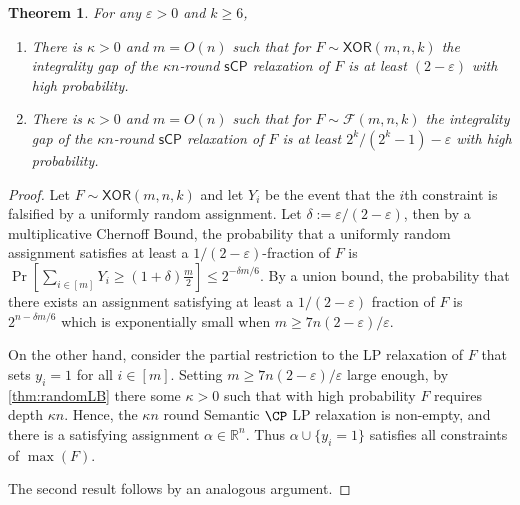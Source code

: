\documentclass[11pt]{article}
\numberwithin{equation}{section}
\newtheorem{theorem}{Theorem}[section]
\theoremstyle{definition}
\theoremstyle{plain}
\newcommand{\XOR}{\ensuremath{\mathsf{XOR}}}
\newcommand{\sCP}{\ensuremath{\mathsf{sCP}}}
\begin{document}
\begin{theorem}
	For any $\varepsilon >0$ and $k \geq 6$,
	\begin{enumerate}
		\item[$1$.] There is $\kappa>0$ and $m = O(n)$ such that for $F \sim \XOR(m,n,k)$ the integrality gap of the $\kappa n$-round  $\sCP$ relaxation of $F$ is at least $(2-\varepsilon)$ with high probability. 
		\item[$2$.] There is $\kappa >0$ and $m=O(n)$ such that for $F \sim \mathcal{F}(m,n,k)$ the integrality gap of the $\kappa n$-round $\sCP$ relaxation of $F$ is at least $2^k/(2^k-1) - \varepsilon$ with high probability.
	\end{enumerate}
\end{theorem}
\begin{proof}
	Let $F \sim \XOR(m,n,k)$ and let $Y_i$ be the event that the $i$th constraint is falsified by a uniformly random assignment. Let $\delta:=\varepsilon/(2-\varepsilon)$, then by a multiplicative Chernoff Bound, the probability that a uniformly random assignment satisfies at least a $1/(2-\varepsilon)$-fraction of $F$ is 
	$ \Pr [\sum_{i \in [m]}Y_i \geq (1+\delta)\frac{m}{2} ] \leq 2^{-\delta m/6}$.
	By a union bound, the probability that there exists an assignment satisfying at least a $1/(2-\varepsilon)$ fraction of $F$ is $2^{n-\delta m/6}$ which is exponentially small when $m \geq 7n(2-\varepsilon)/\varepsilon$.
	
	On the other hand, consider the partial restriction to the LP relaxation of $F$ that sets $y_i=1$ for all $i \in [m]$.
	Setting $m \geq 7n(2-\varepsilon)/\varepsilon$ large enough, by \autoref{thm:randomLB} there some $\kappa > 0$ such that with high probability $F$ requires depth $\kappa n$. 
	Hence, the $\kappa n$ round Semantic $\CP$ LP relaxation is non-empty, and there is a satisfying assignment $\alpha \in \mathbb{R}^n$. Thus $\alpha \cup \{y_i=1\}$ satisfies all constraints of $\max(F)$.
	
	The second result follows by an analogous argument.
\end{proof}




%


%
\end{document}
